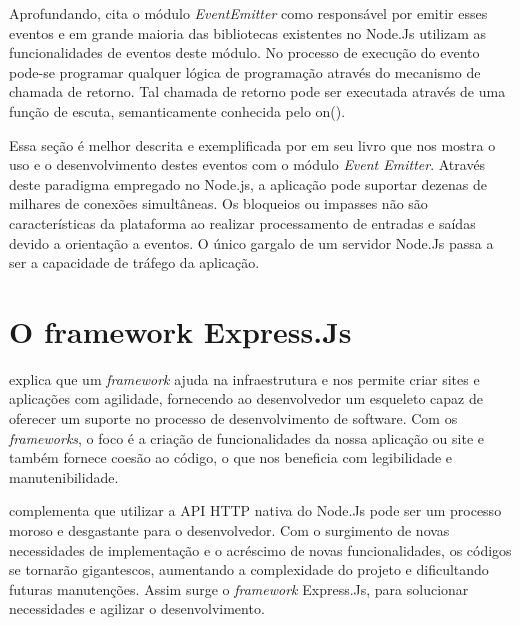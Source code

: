   
  
  Aprofundando,  cita o módulo \textit{EventEmitter} como responsável por emitir esses eventos e em 
  grande maioria das bibliotecas existentes no Node.Js utilizam as funcionalidades de eventos deste módulo. 
  No processo de execução do evento pode-se programar qualquer lógica de programação através do 
  mecanismo de chamada de retorno. Tal chamada de retorno pode ser executada através de uma função de escuta, 
  semanticamente conhecida pelo on().
  
  Essa seção é melhor descrita e exemplificada por  
  em seu livro que nos mostra o uso e o desenvolvimento destes eventos com o módulo \textit{Event Emitter}.
  Através deste paradigma empregado no Node.js, a aplicação pode 
  suportar dezenas de milhares de conexões simultâneas. Os bloqueios ou impasses não são características da plataforma ao
  realizar processamento de entradas e saídas devido a orientação a eventos. \cite{abernethy}
  O único gargalo de um servidor Node.Js passa a ser a capacidade de tráfego da aplicação.\cite{oliveira} 


\section{O framework Express.Js}
\label{framework-express}

   explica que um \textit{framework} ajuda na infraestrutura e nos permite criar sites e aplicações
  com agilidade, fornecendo ao desenvolvedor um esqueleto capaz de oferecer um suporte no processo de desenvolvimento de
  software. Com os \textit{frameworks}, o foco é a criação de funcionalidades da nossa aplicação ou site e 
  também fornece coesão ao código, o que nos beneficia com legibilidade e manutenibilidade.

   complementa que utilizar a API HTTP nativa do Node.Js pode ser um processo moroso e desgastante
  para o desenvolvedor. 
  Com o surgimento de novas necessidades de implementação e o acréscimo de novas funcionalidades,
  os códigos se tornarão gigantescos, aumentando a complexidade do projeto e dificultando futuras manutenções. Assim surge o 
  \textit{framework} Express.Js, para solucionar necessidades e agilizar o desenvolvimento.
  
